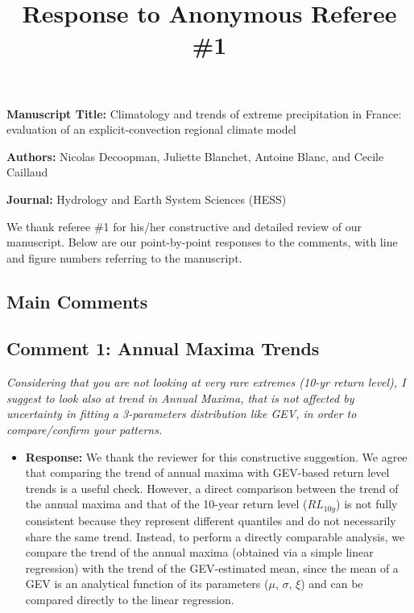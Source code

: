 \documentclass[
  letterpaper,
  DIV=11,
  numbers=noendperiod]{scrartcl}
\title{Response to Anonymous Referee \#1}
\author{}
\date{}
\providecommand{\tightlist}{%
  \setlength{\itemsep}{0pt}\setlength{\parskip}{0pt}}\usepackage{longtable,booktabs,array}
\begin{document}
\maketitle


\textbf{Manuscript Title:} Climatology and trends of extreme
precipitation in France: evaluation of an explicit-convection regional
climate model

\textbf{Authors:} Nicolas Decoopman, Juliette Blanchet, Antoine Blanc,
and Cecile Caillaud

\textbf{Journal:} Hydrology and Earth System Sciences (HESS)

We thank referee \#1 for his/her constructive and detailed review of our
manuscript. Below are our point-by-point responses to the comments, with
line and figure numbers referring to the manuscript.

\subsection{Main Comments}\label{main-comments}

\subsection{Comment 1: Annual Maxima
Trends}\label{comment-1-annual-maxima-trends}

\emph{Considering that you are not looking at very rare extremes (10-yr
return level), I suggest to look also at trend in Annual Maxima, that is
not affected by uncertainty in fitting a 3-parameters distribution like
GEV, in order to compare/confirm your patterns.}

\begin{itemize}
\tightlist
\item
  \textbf{Response:} We thank the reviewer for this constructive
  suggestion. We agree that comparing the trend of annual maxima with
  GEV-based return level trends is a useful check. However, a direct
  comparison between the trend of the annual maxima and that of the
  10-year return level (\(RL_{10y}\)) is not fully consistent because
  they represent different quantiles and do not necessarily share the
  same trend. Instead, to perform a directly comparable analysis, we
  compare the trend of the annual maxima (obtained via a simple linear
  regression) with the trend of the GEV-estimated mean, since the mean
  of a GEV is an analytical function of its parameters (\(\mu\),
  \(\sigma\), \(\xi\)) and can be compared directly to the linear
  regression.
\end{itemize}
\end{document}
